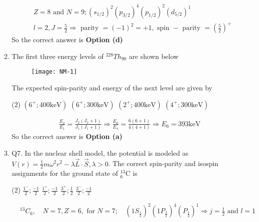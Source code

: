 \begin{enumerate}
\begin{tasks}
	\end{tasks}
	\begin{answer}
		\begin{align*}
		&Z=8 \text { and } N=9 ;\left(s_{1 / 2}\right)^2\left(p_{3 / 2}\right)^4\left(p_{1 / 2}\right)^2\left(d_{5 / 2}\right)^1\\
		&l=2, J=\frac{5}{2} \Rightarrow \text { parity }=(-1)^2=+1, \text { spin }-\text { parity }=\left(\frac{5}{2}\right)^{+}
		\end{align*}
		So the correct answer is \textbf{Option (d)}
	\end{answer}
	\item The first three energy levels of ${ }^{228} T h_{90}$ are shown below
	\begin{figure}[H]
		\centering
		\texttt{[image: NM-1]}
		\caption{}
		\label{}
	\end{figure}
	The expected spin-parity and energy of the next level are given by
	{}
	\begin{tasks}(2)
		\task[\textbf{a.}]$\left(6^{+} ; 400 \mathrm{keV}\right)$
		\task[\textbf{b.}]$\left(6^{+} ; 300 \mathrm{keV}\right)$
		\task[\textbf{c.}]$\left(2^{+} ; 400 \mathrm{keV}\right)$
		\task[\textbf{d.}] $\left(4^{+} ; 300 \mathrm{keV}\right)$
	\end{tasks}
	\begin{answer}
		\begin{align*}
		\frac{E_2}{E_1}=\frac{J_2\left(J_2+1\right)}{J_1\left(J_1+1\right)} \Rightarrow \frac{E_6}{E_4}=\frac{6(6+1)}{4(4+1)} \Rightarrow E_6=393 \mathrm{keV}
		\end{align*}
		So the correct answer is \textbf{Option (a)}
	\end{answer}
	\item Q7. In the nuclear shell model, the potential is modeled as $V(r)=\frac{1}{2} m \omega^2 r^2-\lambda \vec{L} \cdot \vec{S}, \lambda>0$. The correct spin-parity and isospin assignments for the ground state of ${ }_6^{13} \mathrm{C}$ is
	{}
	\begin{tasks}(2)
		\task[\textbf{a.}]$\frac{1^{-}}{2} ; \frac{-1}{2}$
		\task[\textbf{b.}]$\frac{1^{+}}{2} ; \frac{-1}{2}$
		\task[\textbf{c.}]$\frac{3^{+}}{2} ; \frac{1}{2}$
		\task[\textbf{d.}] $\frac{3^{-}}{2} ; \frac{-1}{2}$
	\end{tasks}
	\begin{answer}
		\begin{align*}
		&{ }^{13} C_6, \quad N=7, Z=6, \text { for } N=7 ; \quad\left(1 S_{\frac{1}{2}}\right)^2\left(1 P_{\frac{3}{2}}\right)^4\left(P_{\frac{1}{2}}\right)^1 \Rightarrow j=\frac{1}{2} \text { and } l=1\\

\end{align*}
\end{answer}
\end{enumerate}
